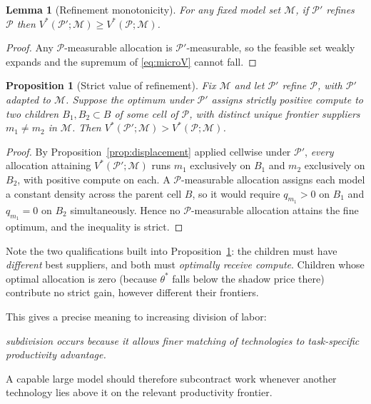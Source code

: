 \documentclass[11pt]{article}
\newtheorem{proposition}{Proposition}
\newtheorem{lemma}{Lemma}
\theoremstyle{definition}
\theoremstyle{remark}
\begin{document}
\begin{lemma}[Refinement monotonicity]
\label{lem:monotone}
For any fixed model set $\mathcal{M}$, if $\mathcal{P}'$ refines $\mathcal{P}$ then $V^*(\mathcal{P}'; \mathcal{M}) \ge V^*(\mathcal{P}; \mathcal{M})$.
\end{lemma}

\begin{proof}
Any $\mathcal{P}$-measurable allocation is $\mathcal{P}'$-measurable, so the feasible set weakly expands and the supremum of \eqref{eq:microV} cannot fall.
\end{proof}

\begin{proposition}[Strict value of refinement]
\label{prop:strict}
Fix $\mathcal{M}$ and let $\mathcal{P}'$ refine $\mathcal{P}$, with $\mathcal{P}'$ adapted to $\mathcal{M}$. Suppose the optimum under $\mathcal{P}'$ assigns strictly positive compute to two children $B_1, B_2 \subset B$ of some cell of $\mathcal{P}$, with distinct unique frontier suppliers $m_1 \neq m_2$ in $\mathcal{M}$. Then $V^*(\mathcal{P}'; \mathcal{M}) > V^*(\mathcal{P}; \mathcal{M})$.
\end{proposition}

\begin{proof}
By Proposition~\ref{prop:displacement} applied cellwise under $\mathcal{P}'$, \emph{every} allocation attaining $V^*(\mathcal{P}'; \mathcal{M})$ runs $m_1$ exclusively on $B_1$ and $m_2$ exclusively on $B_2$, with positive compute on each. A $\mathcal{P}$-measurable allocation assigns each model a constant density across the parent cell $B$, so it would require $q_{m_1} > 0$ on $B_1$ and $q_{m_1} = 0$ on $B_2$ simultaneously. Hence no $\mathcal{P}$-measurable allocation attains the fine optimum, and the inequality is strict.
\end{proof}

Note the two qualifications built into Proposition~\ref{prop:strict}: the children must have \emph{different} best suppliers, and both must \emph{optimally receive compute}. Children whose optimal allocation is zero (because $\theta^*$ falls below the shadow price there) contribute no strict gain, however different their frontiers.

This gives a precise meaning to increasing division of labor:
\begin{center}
\emph{subdivision occurs because it allows finer matching of technologies to task-specific productivity advantage.}
\end{center}
A capable large model should therefore subcontract work whenever another technology lies above it on the relevant productivity frontier.
\end{document}
